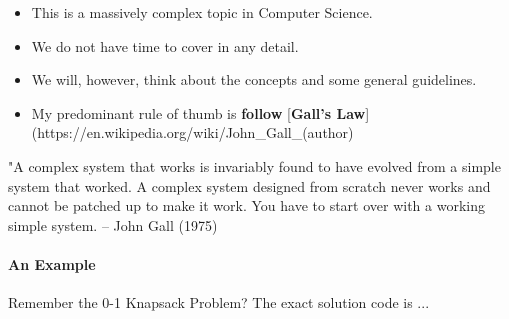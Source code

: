 \documentclass[11pt]{article}
\begin{document}
\begin{itemize}
\item
  This is a massively complex topic in Computer Science.
\item
  We do not have time to cover in any detail.
\item
  We will, however, think about the concepts and some general
  guidelines.
\item
  My predominant rule of thumb is \textbf{follow} {[}\textbf{Gall's
  Law}{]}(https://en.wikipedia.org/wiki/John\_Gall\_(author)
\end{itemize}

"A complex system that works is invariably found to have evolved from a
simple system that worked. A complex system designed from scratch never
works and cannot be patched up to make it work. You have to start over
with a working simple system. -- John Gall (1975)

    \paragraph{An Example}\label{an-example}

Remember the 0-1 Knapsack Problem? The exact solution code is ...
\end{document}
